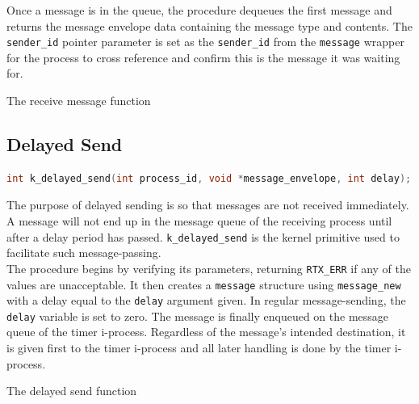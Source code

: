 \documentclass[12pt]{report}
\begin{document}
Once a message is in the queue, the procedure dequeues the first message and returns the message envelope data containing the message type and contents. The {\tt sender\_id} pointer parameter is set as the {\tt sender\_id} from the {\tt message} wrapper for the process to cross reference and confirm this is the message it was waiting for. \\

\begin{algorithm}
  \caption{The receive message function}
  \begin{algorithmic}[1]
		\EndWhile
    \EndProcedure
  \end{algorithmic}
\end{algorithm}

\subsection{Delayed Send}

\begin{minipage}{\textwidth}
\begin{lstlisting}[language=C, frame=single]
int k_delayed_send(int process_id, void *message_envelope, int delay);
\end{lstlisting}
\end{minipage}

The purpose of delayed sending is so that messages are not received immediately. A message will not end up in the message queue of the receiving process until after a delay period has passed. {\tt k\_delayed\_send} is the kernel primitive used to facilitate such message-passing.\\

The procedure begins by verifying its parameters, returning {\tt RTX_ERR} if any of the values are unacceptable. It then creates a {\tt message} structure using {\tt message\_new} with a delay equal to the {\tt delay} argument given. In regular message-sending, the {\tt delay} variable is set to zero. The message is finally enqueued on the message queue of the timer i-process. Regardless of the message's intended destination, it is given first to the timer i-process and all later handling is done by the timer i-process.\\

\begin{algorithm}
  \caption{The delayed send function}
  \begin{algorithmic}[1]
		\EndIf
		\EndIf
    \EndProcedure
  \end{algorithmic}
\end{algorithm}
\end{document}
